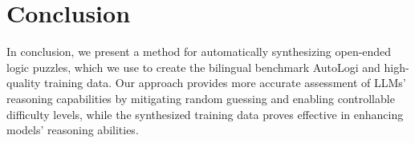 \section{Conclusion}
In conclusion, we present a method for automatically synthesizing open-ended logic puzzles, which we use to create the bilingual benchmark AutoLogi and high-quality training data. Our approach provides more accurate assessment of LLMs' reasoning capabilities by mitigating random guessing and enabling controllable difficulty levels, while the synthesized training data proves effective in enhancing models' reasoning abilities. %